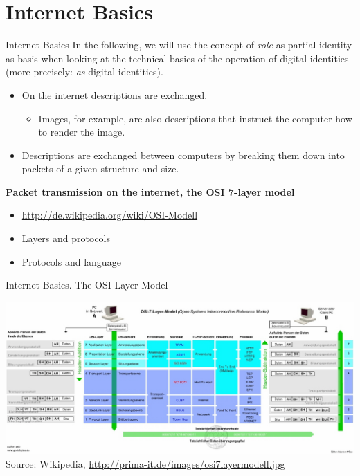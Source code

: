 \documentclass{beamer}
\title{Modelling Sustainable Systems\\ and Semantic Web\\[6pt]
  Internet Basics
  \vskip1em}
\subtitle{Lecture in the Module 10-202-2309\\ for Master Computer Science}
\author{Prof. Dr. Hans-Gert Gräbe\\
\url{http://www.informatik.uni-leipzig.de/~graebe}}
\date{June 2021}
\newcommand{\ueberschrift}[1]{\begin{center}\bf #1\end{center}}
\begin{document}
{
\begin{frame}
  \titlepage
\end{frame}}

\section{Internet Basics}
\begin{frame}{Internet Basics}
In the following, we will use the concept of \emph{role} as partial identity
as basis when looking at the technical basics of the operation of digital
identities (more precisely: \emph{as} digital identities).

\begin{itemize}
\item On the internet descriptions are exchanged.
\begin{itemize}
\item[] Images, for example, are also descriptions that instruct the computer
  how to render the image.
\end{itemize}
\item Descriptions are exchanged between computers by breaking them down into
  packets of a given structure and size.
\end{itemize}

\ueberschrift{Packet transmission on the internet, the OSI 7-layer model}
\begin{itemize}
\item \url{http://de.wikipedia.org/wiki/OSI-Modell}
\item Layers and protocols
\item Protocols and language
\end{itemize}
\end{frame}
\begin{frame}{Internet Basics. The OSI Layer Model}
  \begin{center}\small
    \includegraphics[width=\textwidth]{Rqw330.jpg}\\
    Source: Wikipedia, \url{http://prima-it.de/images/osi7layermodell.jpg} 
  \end{center}
\end{frame}
\end{document}
